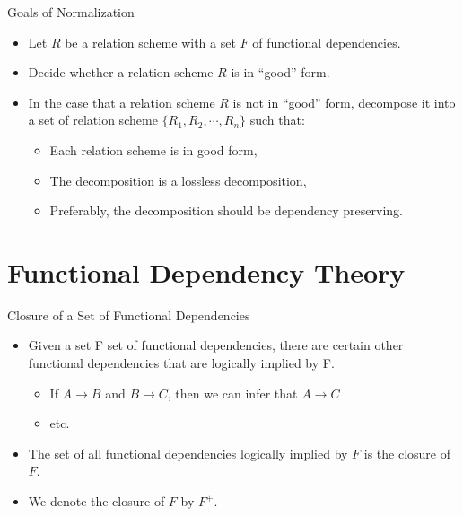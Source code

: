 \documentclass[aspectratio=169]{beamer}
\begin{document}
\begin{frame}{Goals of Normalization}
    \begin{itemize}
        \item Let $R$ be a relation scheme with a set $F$ of functional dependencies.
        \item Decide whether a relation scheme $R$ is in ``good'' form.
        \item In the case that a relation scheme $R$ is not in ``good'' form, decompose it into a set of relation scheme $\{R_1, R_2, \cdots, R_n\}$ such that:
            \begin{itemize}
                \item Each relation scheme is in good form,
                \item The decomposition is a lossless decomposition,
                \item Preferably, the decomposition should be dependency preserving.
            \end{itemize}
    \end{itemize}
\end{frame}

\section{Functional Dependency Theory}


\begin{frame}{Closure of a Set of Functional Dependencies}
    \begin{itemize}
        \item Given a set F set of functional dependencies, there are certain other functional dependencies that are logically implied by F.
            \begin{itemize}
                \item If $A \rightarrow B$ and $B \rightarrow C$, then we can infer that $A \rightarrow C$
                \item etc.
            \end{itemize}
        \item The set of all functional dependencies logically implied by $F$ is the closure of $F$.
        \item We denote the closure of $F$ by $F^+$.
    \end{itemize}
\end{frame}
\end{document}
